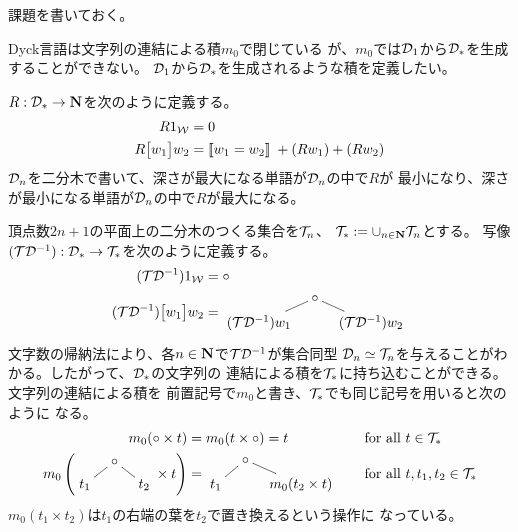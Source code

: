 {	\begin{todo}[残りの話題]\label{todo:残りの話題} %
		課題を書いておく。
	\begin{description}\setlength{\itemsep}{-1mm} %
		\item[Dyck言語の積] Dyck言語は文字列の連結による積$m_0$で閉じている
		が、$m_0$では${{\mathcal{D}}}_1$から${{\mathcal{D}}}_*$を生成することができない。
		${{\mathcal{D}}}_1$から${{\mathcal{D}}}_*$を生成されるような積を定義したい。
		\item[反転に関する対称性] $R:{{\mathcal{D}}}_*\to\mathbf{N}$を次のように定義する。
		\begin{equation*}\begin{split}
			R 1_{{\mathcal{W}}} &= 0 \\
			R \bigl[{w_1}\bigr] w_2 &= [\![w_1=w_2]\!]\; + (Rw_1) + (Rw_2) \\
		\end{split}\end{equation*}
		${{\mathcal{D}}}_n$を二分木で書いて、深さが最大になる単語が${{\mathcal{D}}}_n$の中で$R$が
		最小になり、深さが最小になる単語が${{\mathcal{D}}}_n$の中で$R$が最大になる。
		\item[平面上の二分木]
		頂点数$2n+1$の平面上の二分木のつくる集合を${{\mathcal{T}}}_n$、
		${{\mathcal{T}}}_*:=\cup_{n\in\mathbf{N}}{{\mathcal{T}}}_n$とする。
		写像$({{\mathcal{T}}}{{\mathcal{D}}}^{-1}):{{\mathcal{D}}}_*\to{\ensuremath{{\mathcal{T}}}}_*$を次のように定義する。
		\begin{equation*}\begin{split}
			(\T\D^{-1}) 1_\W &= \circ \\
			(\T\D^{-1}) \gdyck{w_1}w_2 &= \vcenter{\xymatrix@R=1ex@C=2ex{
				& \circ \ar@{-}[dl] \ar@{-}[dr] \\
				(\T\D^{-1})w_1 & & (\T\D^{-1})w_2
			}}
		\end{split}\end{equation*}
		文字数の帰納法により、各$n\in\mathbf{N}$で${{\mathcal{T}}}{{\mathcal{D}}}^{-1}$が集合同型
		${{\mathcal{D}}}_n\simeq{\ensuremath{{\mathcal{T}}}}_n$を与えることがわかる。したがって、${{\mathcal{D}}}_*$の文字列の
		連結による積を${{\mathcal{T}}}_*$に持ち込むことができる。文字列の連結による積を
		前置記号で$m_0$と書き、${{\mathcal{T}}}_*$でも同じ記号を用いると次のように
		なる。
		\begin{alignat*}{2}
			m_0(\circ\times t) &= m_0(t\times \circ) 
			= t &&\quad\text{for all } t\in\T_* \\
			m_0\left(\vcenter{\xymatrix@R=1ex@C=2ex{
				& \circ \ar@{-}[dl] \ar@{-}[dr] \\
				t_1 & & t_2
			}}\times t\right) &= \vcenter{\xymatrix@R=1ex@C=2ex{
				& \circ \ar@{-}[dl] \ar@{-}[dr] \\
				t_1 & & m_0(t_2\times t)
			}} &&\quad\text{for all } t,t_1,t_2\in\T_* \\
		\end{alignat*}
		$m_0(t_1\times t_2)$は$t_1$の右端の葉を$t_2$で置き換えるという操作に
		なっている。
		\end{description} %
	\end{todo} %
%
}\endgroup %
